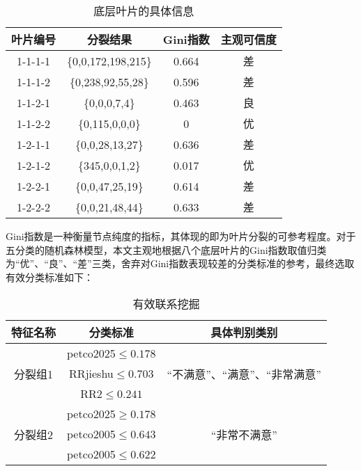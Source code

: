 \begin{table}[H]
    \centering  
    \caption{底层叶片的具体信息}
    \begin{tabular}{c c c c}  
    	\toprule[1.5pt]  
    	叶片编号  & 分裂结果  & Gini指数  & 主观可信度\\  
    	\midrule[1pt]
        1-1-1-1 &  \{0,0,172,198,215\}      & 0.664  & 差       \\
        1-1-1-2 &  \{0,238,92,55,28\}       & 0.596  & 差       \\
        1-1-2-1 &  \{0,0,0,7,4\}            & 0.463  & 良       \\
        1-1-2-2 &  \{0,115,0,0,0\}          & 0      & 优       \\
        1-2-1-1 &  \{0,0,28,13,27\}         & 0.636  & 差       \\
        1-2-1-2 &  \{345,0,0,1,2\}          & 0.017  & 优       \\
        1-2-2-1 &  \{0,0,47,25,19\}         & 0.614  & 差       \\
        1-2-2-2 &  \{0,0,21,48,44\}         & 0.633  & 差       \\
    	\toprule[1.5pt]  
    \end{tabular}  
\end{table} 

Gini指数是一种衡量节点纯度的指标，其体现的即为叶片分裂的可参考程度。对于五分类的随机森林模型，本文主观地根据八个底层叶片的Gini指数取值归类为“优”、“良”、“差”三类，舍弃对Gini指数表现较差的分类标准的参考，最终选取有效分类标准如下：

\begin{table}[H]
    \centering  
    \caption{有效联系挖掘}
    \begin{tabular}{c c c}  
    	\toprule[1.5pt]  
    	特征名称  & 分类标准  & 具体判别类别  \\  
    	\midrule[1pt]
        \multirow{3}{*}{分裂组1} & petco2025$\leq 0.178$ &  \multirow{3}{*}{“不满意”、“满意”、“非常满意”}    \\
                                 & RRjieshu$\leq  0.703$ &                                                   \\
                                 & RR2$\leq0.241$        &                                                   \\
        \multirow{3}{*}{分裂组2} & petco2025$\geq 0.178$ &  \multirow{3}{*}{“非常不满意”}                    \\
                                 & petco2005$\leq 0.643$ &                                                   \\
                                 & petco2005$\leq 0.622$ &                                                   \\ 
    	\toprule[1.5pt]  
    \end{tabular}  
\end{table}                

